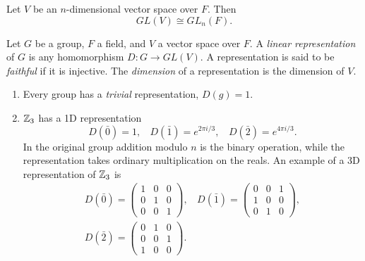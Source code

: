 \begin{theorem}{}{}
  Let $V$ be an $n$-dimensional vector space over $F$. Then 
  $$GL(V)\cong GL_{n}(F).$$
\end{theorem}

Let $G$ be a group, $F$ a field, and $V$ a vector space over
$F$. A {\it linear representation} of $G$ 
is any homomorphism $D:G\to GL(V)$. A representation is said to be 
{\it faithful} if it is injective. 
The {\it dimension} of a representation 
is the dimension of $V$.

\begin{example*}{}{}
\leavevmode
\begin{enumerate}
  \item Every group has a {\it trivial} 
    representation, $D(g)=1$.
  \item 
  $\mathbb{Z}_3$ has a 1D representation
  \begin{equation}
    D\left(\bar{0}\right)=1,~~~~
    D\left(\bar{1}\right)=e^{2\pi i/3},~~~~
    D\left(\bar{2}\right)=e^{4\pi i/3}.
  \end{equation}
  In the original group addition modulo $n$ is the binary operation,
  while the representation takes ordinary multiplication on the reals.
  An example of a 3D representation of $\mathbb{Z}_3$ is
  \begin{equation}\label{eq:reg}
  \begin{gathered}
    D\left(\bar{0}\right)=\left(\begin{array}{ccc}
                           1 & 0 & 0 \\
                           0 & 1 & 0 \\
                           0 & 0 & 1
                          \end{array}\right),~~~~
    D\left(\bar{1}\right)=\left(\begin{array}{ccc}
                           0 & 0 & 1 \\
                           1 & 0 & 0 \\
                           0 & 1 & 0
                          \end{array}\right),\\
    D\left(\bar{2}\right)=\left(\begin{array}{ccc}
                           0 & 1 & 0 \\
                           0 & 0 & 1 \\
                           1 & 0 & 0
                          \end{array}\right).
  \end{gathered}
  \end{equation}
  \end{enumerate}
\end{example*}
